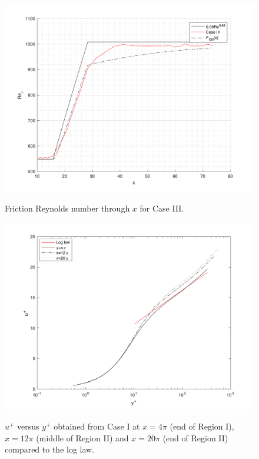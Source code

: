 \documentclass[twocolumn,10pt]{asme2e}
\begin{document}
\begin{figure}[t]
\centering
\scalebox{0.5}
{\includegraphics{convolution_CIII.pdf}}
\caption{Friction Reynolds number through \(x\) for Case III.}
\label{fig:convolution_CIII}
\end{figure}

\begin{figure}[t]
\centering
\scalebox{0.5}
{\includegraphics{log_law_CI_upstream.pdf}}
\caption{\(u^+\) versus \(y^+\) obtained from Case I at \(x=4{\pi}\) (end of Region I), \(x=12{\pi}\) (middle of Region II) and \(x=20{\pi}\) (end of Region II) compared to the log law.}
\label{fig:log_law_CI_upstream}
\end{figure}
\end{document}
